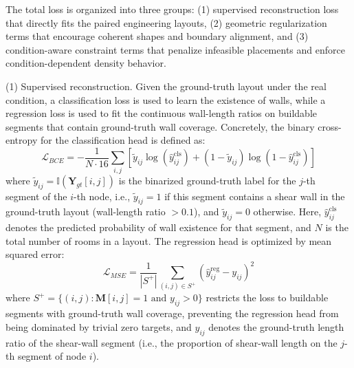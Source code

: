 The total loss is organized into three groups: (1) supervised reconstruction loss that directly fits the paired engineering layouts, (2) geometric regularization terms that encourage coherent shapes and boundary alignment, and (3) condition-aware constraint terms that penalize infeasible placements and enforce condition-dependent density behavior.

(1) Supervised reconstruction. Given the ground-truth layout under the real condition, a classification loss is used to learn the existence of walls, while a regression loss is used to fit the continuous wall-length ratios on buildable segments that contain ground-truth wall coverage.
Concretely, the binary cross-entropy for the classification head is defined as:
\begin{equation}
\mathcal{L}_{BCE} = -\frac{1}{N \cdot 16}\sum_{i,j}\left[\tilde{y}_{ij}\log(\hat{y}_{ij}^{\text{cls}}) + (1-\tilde{y}_{ij})\log(1-\hat{y}_{ij}^{\text{cls}})\right]
\label{eq:loss_bce}
\end{equation}
where $\tilde{y}_{ij} = \mathbb{I}(\mathbf{Y}_{gt}[i,j])$ is the binarized ground-truth label for the \(j\)-th segment of the \(i\)-th node, i.e., \(\tilde{y}_{ij}=1\) if this segment contains a shear wall in the ground-truth layout (wall-length ratio \(>0.1\)), and \(\tilde{y}_{ij}=0\) otherwise. Here, \(\hat{y}_{ij}^{\text{cls}}\) denotes the predicted probability of wall existence for that segment, and $N$ is the total number of rooms in a layout.
The regression head is optimized by mean squared error:
\begin{equation}
\mathcal{L}_{MSE} = \frac{1}{|S^+|}\sum_{(i,j) \in S^+}(\hat{y}_{ij}^{\text{reg}} - y_{ij})^2
\label{eq:loss_mse}
\end{equation}
where $S^+ = \{(i,j) : \mathbf{M}[i,j] = 1 \text{ and } y_{ij} > 0\}$ restricts the loss to buildable segments with ground-truth wall coverage, preventing the regression head from being dominated by trivial zero targets, and \(y_{ij}\) denotes the ground-truth length ratio of the shear-wall segment (i.e., the proportion of shear-wall length on the \(j\)-th segment of node \(i\)).

